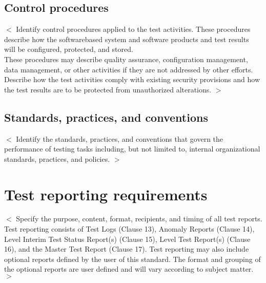\documentclass{scrreprt}
\begin{document}
\subsection{Control procedures}
$<$ Identify control procedures applied to the test activities. These procedures describe how the softwarebased system and software products and test results will be configured, protected, and stored.\\
These procedures may describe quality assurance, configuration management, data management, or other activities if they are not addressed by other efforts. Describe how the test activities comply with existing security provisions and how the test results are to be protected from unauthorized alterations. $>$

\subsection{Standards, practices, and conventions}
$<$ Identify the standards, practices, and conventions that govern the performance of testing tasks including, but not limited to, internal organizational standards, practices, and policies. $>$

\section{Test reporting requirements}
$<$ Specify the purpose, content, format, recipients, and timing of all test reports. Test reporting consists of Test Logs (Clause 13), Anomaly Reports (Clause 14), Level Interim Test Status Report(s) (Clause 15), Level Test Report(s) (Clause 16), and the Master Test Report (Clause 17). Test reporting may also include optional reports defined by the user of this standard. The format and grouping of the optional reports are user defined and will vary according to subject matter. $>$

\printglossaries
\end{document}
